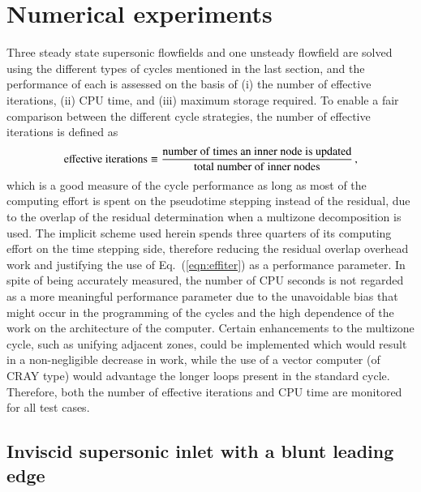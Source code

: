 \section{Numerical experiments}
\label{section:numerical_experiments}

Three steady state supersonic flowfields and one unsteady
flowfield are solved using the different types of cycles
mentioned in the last section, and the performance of each is
assessed on the basis of (i) the number of effective iterations,
(ii) CPU time, and (iii) maximum storage required. To enable a fair
comparison between the different
cycle strategies, the number of effective iterations is defined as
%
\begin{equation}
  {\rm effective~iterations} \equiv
           \frac{\rm number~of~times~an~inner~node~is~updated}
                {\rm total~number~of~inner~nodes} \, ,
  \label{eqn:effiter}
\end{equation}
%
which is a good measure of the cycle performance as long as most of the
computing effort is spent on the pseudotime stepping instead of the
residual, due to the overlap of the residual
determination when a multizone decomposition is used.
The implicit scheme used herein spends three
quarters of its computing effort on the time stepping side, therefore reducing
the residual overlap overhead work and justifying the use of Eq.~(\ref{eqn:effiter})
as a performance parameter. In spite of being accurately measured, the number of
CPU seconds is not regarded as a more meaningful performance parameter due to the
unavoidable bias that might occur in the programming of the cycles and the high
dependence of the work on the architecture of the computer. Certain
enhancements to the multizone cycle, such as unifying adjacent zones, could be implemented which would
result in a non-negligible decrease in work, while the use of a vector
computer (of CRAY type) would advantage the longer loops present in the
standard cycle. Therefore, both the number of effective iterations and CPU time are
monitored for all test cases.






\subsection{Inviscid supersonic inlet with a blunt leading edge}

